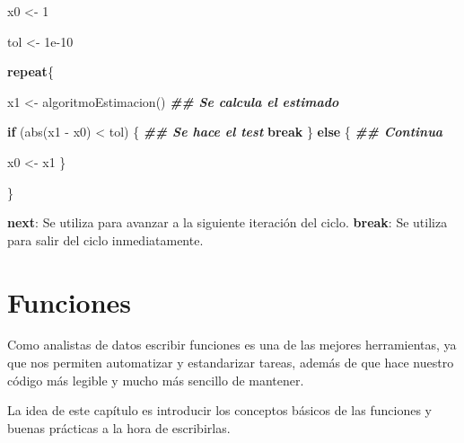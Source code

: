\documentclass[
  12pt,
]{book}
\newenvironment{Shaded}{\begin{snugshade}}{\end{snugshade}}
\newcommand{\ControlFlowTok}[1]{\textcolor[rgb]{0.13,0.29,0.53}{\textbf{#1}}}
\newcommand{\DecValTok}[1]{\textcolor[rgb]{0.00,0.00,0.81}{#1}}
\newcommand{\DocumentationTok}[1]{\textcolor[rgb]{0.56,0.35,0.01}{\textbf{\textit{#1}}}}
\newcommand{\FloatTok}[1]{\textcolor[rgb]{0.00,0.00,0.81}{#1}}
\newcommand{\FunctionTok}[1]{\textcolor[rgb]{0.00,0.00,0.00}{#1}}
\newcommand{\NormalTok}[1]{#1}
\newcommand{\OtherTok}[1]{\textcolor[rgb]{0.56,0.35,0.01}{#1}}
\newcommand{\SpecialCharTok}[1]{\textcolor[rgb]{0.00,0.00,0.00}{#1}}
\begin{document}
\begin{Shaded}
\begin{Highlighting}[]
\NormalTok{x0 }\OtherTok{\textless{}{-}} \DecValTok{1}

\NormalTok{tol }\OtherTok{\textless{}{-}} \FloatTok{1e{-}10}

\ControlFlowTok{repeat}\NormalTok{\{}


\NormalTok{  x1 }\OtherTok{\textless{}{-}} \FunctionTok{algoritmoEstimacion}\NormalTok{() }\DocumentationTok{\#\# Se calcula el estimado}

  \ControlFlowTok{if}\NormalTok{ (}\FunctionTok{abs}\NormalTok{(x1 }\SpecialCharTok{{-}}\NormalTok{ x0) }\SpecialCharTok{\textless{}}\NormalTok{ tol) \{ }\DocumentationTok{\#\# Se hace el test}
    \ControlFlowTok{break}
\NormalTok{  \} }\ControlFlowTok{else}\NormalTok{ \{   }\DocumentationTok{\#\# Continua}

\NormalTok{    x0 }\OtherTok{\textless{}{-}}\NormalTok{ x1}
\NormalTok{  \}}

\NormalTok{\}}
\end{Highlighting}
\end{Shaded}

\textbf{next}: Se utiliza para avanzar a la siguiente iteración del ciclo.
\textbf{break}: Se utiliza para salir del ciclo inmediatamente.

\hypertarget{funciones}{%
\chapter{\texorpdfstring{\textbf{Funciones}}{Funciones}}\label{funciones}}

Como analistas de datos escribir funciones es una de las mejores herramientas, ya que nos permiten automatizar y estandarizar tareas, además de que hace nuestro código más legible y mucho más sencillo de mantener.

La idea de este capítulo es introducir los conceptos básicos de las funciones y buenas prácticas a la hora de escribirlas.
\end{document}
